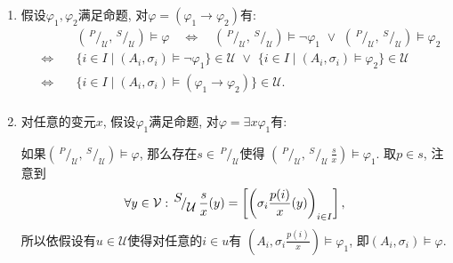 \documentclass[UTF8]{ctexart}
\begin{document}
\begin{enumerate}
    \item 假设$\varphi_1,\varphi_2$满足命题, 对$\varphi=(\varphi_1\to\varphi_2)$有:
    \vspace{5pt}
    \[\begin{aligned}
        &\left(\,^{\displaystyle P}\!/_{\displaystyle\mathcal{U}},\,
        ^{\displaystyle S}\!/_{\displaystyle\mathcal{U}}\right)\models\varphi
        \quad\iff\quad\left(\,^{\displaystyle P}\!/_{\displaystyle\mathcal{U}},\,
        ^{\displaystyle S}\!/_{\displaystyle\mathcal{U}}\right)\models\neg\varphi_1
        \,\,\lor\,\,\left(\,^{\displaystyle P}\!/_{\displaystyle\mathcal{U}},\,
        ^{\displaystyle S}\!/_{\displaystyle\mathcal{U}}\right)\models\varphi_2\\
        \quad\iff\quad&\{i\in I\mid(A_i,\sigma_i)\models\neg\varphi_1\}\in\mathcal{U}
        \,\,\lor\,\,\{i\in I\mid(A_i,\sigma_i)\models\varphi_2\}\in\mathcal{U}\\
        \quad\iff\quad&\{i\in I\mid(A_i,\sigma_i)\models(\varphi_1\to\varphi_2)\}
        \in\mathcal{U}.\\[3pt]
    \end{aligned}\]

    \item 对任意的变元$x$, 假设$\varphi_1$满足命题, 对$\varphi=\exists x\varphi_1$有:
    
    \vspace{3pt}\hspace{2.17em}
    如果$\left(\,^{\displaystyle P}\!/_{\displaystyle\mathcal{U}},\,
    ^{\displaystyle S}\!/_{\displaystyle\mathcal{U}}\right)\models\varphi$,
    那么存在$s\in\,\!^{\displaystyle P}\!/_{\displaystyle\mathcal{U}}$使得
    $\left(\,^{\displaystyle P}\!/_{\displaystyle\mathcal{U}},\,^{\displaystyle S}
    \!/_{\displaystyle\mathcal{U}}\,\displaystyle\frac{s}{x}\right)\models\varphi_1$.
    取$p\in s$, 注意到
    \vspace{3pt}
    \[
        \forall y\in\mathcal{V}:\,^{\displaystyle S}
        \!/_{\displaystyle\mathcal{U}}\,\displaystyle\frac{s}{x}(y)
        =\left[\left(\sigma_i\frac{p(i)}{x}(y)\right)_{i\in I}\right],\\[3pt]
    \]
    所以依假设有$u\in\mathcal{U}$使得对任意的$i\in u$有
    $\left(A_i,\sigma_i\displaystyle\frac{p(i)}{x}\right)\models\varphi_1$,
    即$(A_i,\sigma_i)\models\varphi$.


\end{enumerate}
\end{document}

